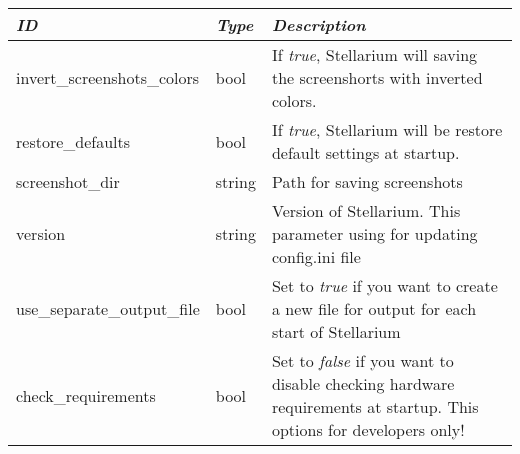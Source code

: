 \section{}\label{section-main}

\begin{longtabu} to \textwidth {l|l|X}
\toprule
\emph{ID} & \emph{Type} & \emph{Description}\\
\midrule
invert\_screenshots\_colors & bool & If \emph{true},
Stellarium will saving the screenshorts with inverted
colors.\\
\midrule
restore\_defaults & bool & If \emph{true}, Stellarium will be
restore default settings at startup.\\
\midrule
screenshot\_dir & string & Path for saving
screenshots\\
\midrule
version & string & Version of Stellarium. This parameter
using for updating config.ini file\\
\midrule
use\_separate\_output\_file & bool & Set to \emph{true} if you
want to create a new file for output for each start of
Stellarium\\
\midrule
check\_requirements & bool & Set to \emph{false} if you want
to disable checking hardware requirements at startup. This options for
developers only!\\
\bottomrule
\end{longtabu}

\section{}\label{section-navigation}

